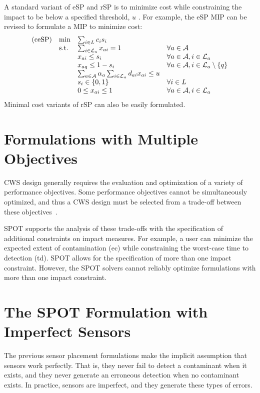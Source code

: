 A standard variant of eSP and rSP is to minimize cost while constraining the impact to be below a specified threshold, $u$ . For example, the eSP MIP can be revised to formulate a MIP to minimize cost: \[ \begin{array}{llll} {\rm (ceSP)} & \min & \sum_{i \in L} c_i s_i & \\ & {\rm s.t.} & \sum_{i\in {\cal L}_a} x_{ai} = 1 &\forall a \in {\cal A}\\ & & x_{ai} \le s_i & \forall a \in {\cal A}, i \in {\cal L}_a\\ & & x_{aq} \leq 1-s_i & \forall a \in {\cal A}, i \in {\cal L}_a \setminus \{q\}\\ & & \sum_{a \in {\cal A}} \alpha_a \sum_{i \in {\cal L}_a} d_{ai} x_{ai} \leq u&\\ & & s_i \in \{0,1\} & \forall i \in L\\ & & 0 \leq x_{ai} \leq 1 & \forall a \in {\cal A}, i \in {\cal L}_a \end{array} \] Minimal cost variants of rSP can also be easily formulated.

\section{Formulations with Multiple Objectives}\label{formulations_formulationsMultiObj}

CWS design generally requires the evaluation and optimization of a variety of performance objectives. Some performance objectives cannot be simultaneously optimized, and thus a CWS design must be selected from a trade-\/off between these   
objectives~\cite{WatGreHar04a}.

SPOT supports the analysis of these trade-\/offs with the specification of additional constraints on impact measures. For example, a user can minimize the expected extent of contamination (ec) while constraining the worst-\/case time to detection (td). SPOT allows for the specification of more than one impact constraint. However, the SPOT solvers cannot reliably optimize formulations with more than one impact constraint.

\section{The SPOT Formulation with Imperfect Sensors}\label{formulations_formulationsImperfect}

The previous sensor placement formulations make the implicit assumption that sensors work perfectly. That is, they never fail to detect a contaminant when it exists, and they never generate an erroneous detection when no contaminant exists. In practice, sensors are imperfect, and they generate these types of errors.

